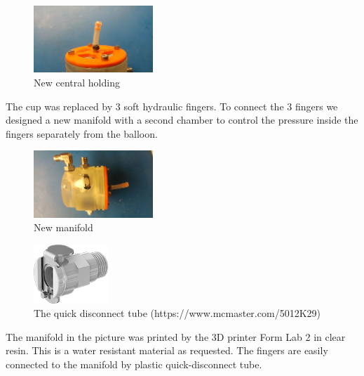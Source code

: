 \documentclass{article}
\begin{document}
\begin{figure}[h]
    \centering
    \includegraphics[width=0.4\textwidth]{Pictures/fingerOnToroidal/NewCentralHolding.jpg}
    \caption{New central holding}
    \label{fig:newCentralHolding}
\end{figure}

The cup was replaced by 3 soft hydraulic fingers. To connect the 3 fingers we designed a new manifold with a second chamber to control the pressure inside the fingers separately from the balloon.

\begin{figure}[h]
    \centering
    \includegraphics[width=0.4\textwidth]{Pictures/fingerOnToroidal/NewManifold.jpg}
    \caption{New manifold}
    \label{fig:newManifold}
\end{figure}

\begin{figure}[h]
    \centering
    \includegraphics[width=0.25\textwidth]{Pictures/fingerOnToroidal/Plastic_quick_disconnect_tube.png}
    \caption{The quick disconnect tube (https://www.mcmaster.com/5012K29)}
    \label{fig:quickDisconnector}
\end{figure}

The manifold in the picture was printed by the 3D printer Form Lab 2 in clear resin. This is a water resistant material as requested.
The fingers are easily connected to the manifold by plastic quick-disconnect tube.
\end{document}
